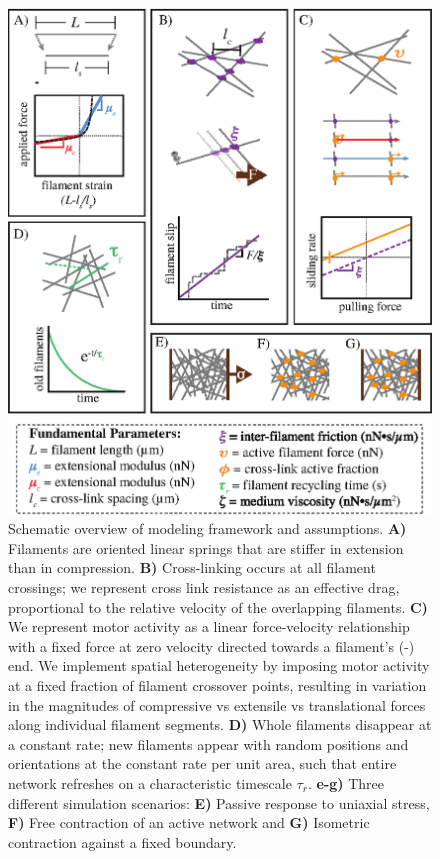 \begin{figure}[H]
	\centering
	\includegraphics[width=0.8\hsize]{model/figures/Fig1}
	\caption{\label{fig:model_overview} Schematic overview of modeling framework and assumptions. \textbf{A)} Filaments are oriented linear springs that are stiffer in extension than in compression. \textbf{B)} Cross-linking occurs at all filament crossings; we represent cross link resistance as an effective drag, proportional to the relative velocity of the overlapping filaments. \textbf{C)} We represent motor activity as a linear force-velocity relationship with a fixed force at zero velocity directed towards a filament's (-) end. We implement spatial heterogeneity by imposing motor activity at a fixed fraction of filament crossover points, resulting in variation in the magnitudes of compressive vs extensile vs translational forces along individual filament segments. \textbf{D)} Whole filaments disappear at a constant rate; new filaments appear with random positions and orientations at the constant rate per unit area, such that entire network refreshes on a characteristic timescale $\tau_r$. \textbf{e-g)} Three different simulation scenarios: \textbf{E)} Passive response to uniaxial stress, \textbf{F)} Free contraction of an active network and \textbf{G)} Isometric contraction against a fixed boundary. }
\end{figure}

